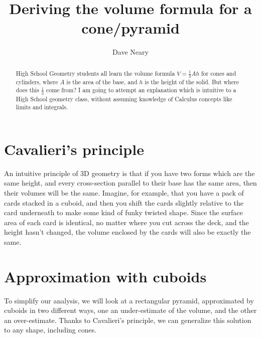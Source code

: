 \documentclass{article}
\title{Deriving the volume formula for a cone/pyramid}
\author{Dave Neary}
\begin{document}
\maketitle

\begin{abstract}
High School Geometry students all learn the volume formula $V=\frac{1}{3}Ah$ for cones
and cylinders, where $A$ is the area of the base, and $h$ is the height of the solid. But
where does this $\frac{1}{3}$ come from?
I am going to attempt an explanation which is intuitive to a High School geometry class,
without assuming knowledge of Calculus concepts like limits and integrals.
\end{abstract}

\section*{Cavalieri's principle}

An intuitive principle of 3D geometry is that if you have two forms which are the same height,
and every cross-section parallel to their base has the same area, then their volumes will be
the same. Imagine, for example, that you have a pack of cards stacked in a cuboid, and then
you shift the cards slightly relative to the card underneath to make some kind of funky
twisted shape. Since the surface area of each card is identical, no matter where you cut
across the deck, and the height hasn't changed, the volume enclosed by the cards will also
be exactly the same.

\section*{Approximation with cuboids}

To simplify our analysis, we will look at a rectangular pyramid, approximated by cuboids in two
different ways, one an under-estimate of the volume, and the other an over-estimate.
Thanks to Cavalieri's principle, we can generalize this solution to any shape, including cones.

\begin{center}
\end{center}
\end{document}
